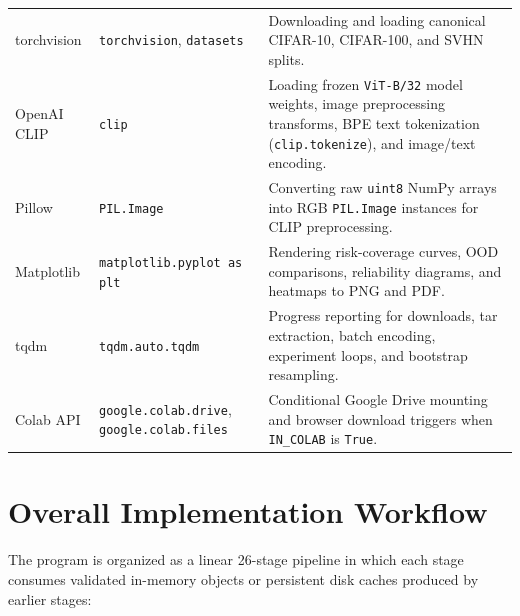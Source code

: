 \documentclass[11pt,a4paper]{article}
\begin{document}
\begin{table}[!htbp]
\begin{tabularx}{\textwidth}{L{0.16\textwidth} L{0.28\textwidth} Y}
torchvision & \texttt{torchvision}, \texttt{datasets} & Downloading and loading canonical CIFAR-10, CIFAR-100, and SVHN splits. \\
OpenAI CLIP & \texttt{clip} & Loading frozen \texttt{ViT-B/\allowbreak{}32} model weights, image preprocessing transforms, BPE text tokenization (\texttt{clip.\allowbreak{}tokenize}), and image/text encoding. \\
Pillow & \texttt{PIL.\allowbreak{}Image} & Converting raw \texttt{uint8} NumPy arrays into RGB \texttt{PIL.\allowbreak{}Image} instances for CLIP preprocessing. \\
Matplotlib & \texttt{matplotlib.\allowbreak{}pyplot as plt} & Rendering risk-coverage curves, OOD comparisons, reliability diagrams, and heatmaps to PNG and PDF. \\
tqdm & \texttt{tqdm.\allowbreak{}auto.\allowbreak{}tqdm} & Progress reporting for downloads, tar extraction, batch encoding, experiment loops, and bootstrap resampling. \\
Colab API & \texttt{google.\allowbreak{}colab.\allowbreak{}drive}, \texttt{google.\allowbreak{}colab.\allowbreak{}files} & Conditional Google Drive mounting and browser download triggers when \texttt{IN\_\allowbreak{}COLAB} is \texttt{True}. \\
\bottomrule
\end{tabularx}
\end{table}

\section{Overall Implementation Workflow}

The program is organized as a linear 26-stage pipeline in which each stage consumes validated in-memory objects or persistent disk caches produced by earlier stages:
\end{document}
